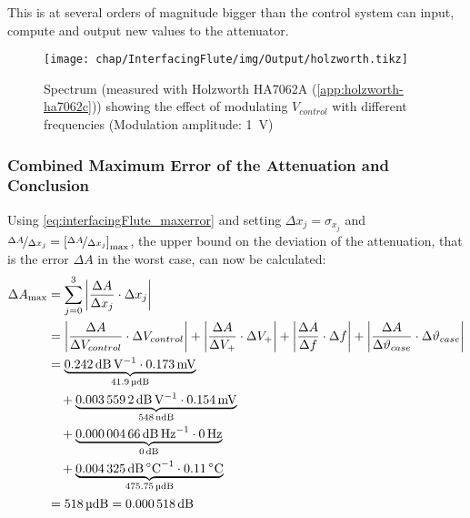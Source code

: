 This is at several orders of magnitude bigger than the control system can input, compute and output new values to the attenuator.

\begin{figure}[tb]
	\centering
	\texttt{[image: chap/InterfacingFlute/img/Output/holzworth.tikz]}
	\caption{Spectrum (measured with Holzworth HA7062A (\autoref{app:holzworth-ha7062c})) showing the effect of modulating $V_{control}$ with different frequencies (Modulation amplitude: \SI{1}{\volt})}
	\label{fig:interfacingFlute_atteneval-freqresp}
\end{figure}

\subsubsection{Combined Maximum Error of the Attenuation and Conclusion}
Using \autoref{eq:interfacingFlute_maxerror} and setting $\Delta x_j = \sigma_{x_j}$ and $\nicefrac{\Delta A}{\Delta x_j} = \left[\nicefrac{\Delta A}{\Delta x_j}\right]_\text{max}$, the upper bound on the deviation of the attenuation, that is the error $\Delta A$ in the worst case, can now be calculated:
\begin{align}
\Delta A_{\text{max}} &= \sum_{j=0}^{3} \left|\frac{\Delta A}{\Delta x_j} \cdot \Delta x_j\right|\\
                      &= \left|\frac{\Delta A}{\Delta V_{control}} \cdot \Delta V_{control}\right|
                      +  \left|\frac{\Delta A}{\Delta V_{+}} \cdot \Delta V_{+}\right|
                      +  \left|\frac{\Delta A}{\Delta f} \cdot \Delta f\right|
                      +  \left|\frac{\Delta A}{\Delta \vartheta_{case}} \cdot \Delta \vartheta_{case}\right|\\
                      &=       \underbrace{\SI{0.242}{\dB\per\volt} \cdot \SI{0.173}{\milli\volt}}_{\SI{41.9}{\micro\dB\relax}}\\
                      &\quad+  \underbrace{\SI{0.0035592}{\dB\per\volt} \cdot \SI{0.154}{\milli\volt}}_{\SI{548}{\nano\dB\relax}}\\
                      &\quad+  \underbrace{\SI{0.00000466}{\dB\per\hertz} \cdot \SI{0}{\hertz}}_{\SI{0}{\dB\relax}}\\
                      &\quad+  \underbrace{\SI{0.004325}{\dB\per\celsius} \cdot \SI{0.11}{\celsius}}_{\SI{475.75}{\micro\dB\relax}}\\
                      &= \SI{518}{\micro\dB\relax} = \SI{0.000518}{\dB}
\end{align}

